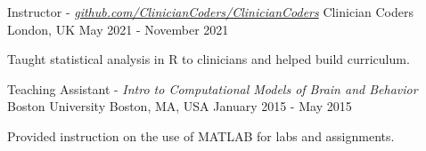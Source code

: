 %
%
%


\vspace*{0.4cm}

\begin{cventries}

    \cventry
        {Instructor - \textit{\href{https://github.com/ClinicianCoders/ClinicianCoders}{github.com/ClinicianCoders/ClinicianCoders}}}
        {Clinician Coders}
        {London, UK}
        {May 2021 - November 2021}
        {
            \begin{cvitems}
                \item Taught statistical analysis in R to clinicians and helped build curriculum.
            \end{cvitems}\vspace{1.5\baselineskip}
        }

    \vspace*{0.2cm}

    \cventry
        {Teaching Assistant - \textit{Intro to Computational Models of Brain and Behavior}}
        {Boston University}
        {Boston, MA, USA}
        {January 2015 - May 2015}
        {
            \begin{cvitems}
                \item Provided instruction on the use of MATLAB for labs and assignments.
            \end{cvitems}\vspace{1.5\baselineskip}
        }

\end{cventries}

\vspace*{-0.4cm}
